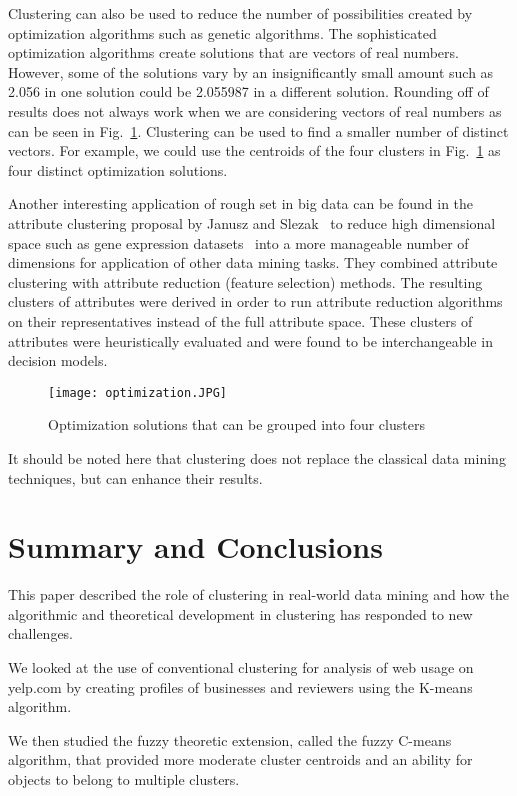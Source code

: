 \documentclass[oribibl]{llncs}
\begin{document}
Clustering can also be used to reduce the number of possibilities created by optimization algorithms such as genetic algorithms. The sophisticated optimization algorithms create solutions that are vectors of real numbers. However, some of the solutions vary by an insignificantly small amount such as 2.056 in one solution could be 2.055987 in a different solution. Rounding off of results does not always work when we are considering vectors of real numbers as can be seen in Fig.~\ref{optimization}. Clustering can be used to find a smaller number of distinct vectors. For example, we could use the centroids of the four clusters in Fig.~\ref{optimization} as four distinct optimization solutions.

Another interesting application of rough set in big data can be found in the attribute clustering proposal by Janusz and Slezak~\cite{janusz2014rough} to reduce high dimensional space such as gene expression datasets~\cite{slezak2007rough} into a more manageable number of dimensions for application of other data mining tasks.
They combined attribute clustering with attribute reduction (feature selection) methods.
The resulting clusters of attributes were derived in order to run attribute reduction algorithms on their representatives instead of the full attribute space.
These clusters of attributes were heuristically evaluated and were found to be interchangeable in decision models.

\begin{figure}
\centerline{\texttt{[image: optimization.JPG]}}
\caption{Optimization solutions that can be grouped into four clusters}
\label{optimization}
\end{figure}

It should be noted here that clustering does not replace the classical data mining techniques, but can enhance their results.

\section{Summary and Conclusions}
This paper described the role of clustering in real-world data mining and how the algorithmic and theoretical development in clustering has responded to new challenges.

We looked at the use of conventional clustering for analysis of web usage on yelp.com by creating profiles of businesses and reviewers using the K-means algorithm.

We then studied the fuzzy theoretic extension, called the fuzzy C-means algorithm, that provided more moderate cluster centroids and an ability for objects to belong to multiple clusters.
\end{document}
